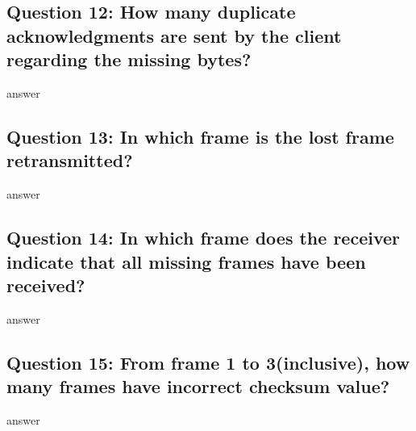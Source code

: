 \documentclass[11pt, oneside, a4paper]{article}
\begin{document}
\subsection*{Question 12: How  many  duplicate  acknowledgments  are  sent  by  the  client  regarding the missing bytes?}
answer

\subsection*{Question 13: In which frame is the lost frame retransmitted?}
answer

\subsection*{Question 14: In  which  frame  does  the  receiver  indicate  that all  missing  frames  have  been received?}
answer

\subsection*{Question 15: From frame 1 to 3(inclusive), how many frames have incorrect checksum value?}
answer
\end{document}
